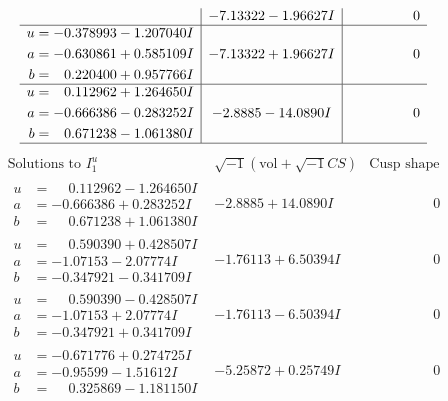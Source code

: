 \documentclass[1p]{elsarticle_modified}
\theoremstyle{definition}
\newcommand{\I}{\sqrt{-1}}
\begin{document}
$$\begin{array}{c|c|c}
 & -7.13322 - 1.96627 I & \phantom{-0.000000 } 0 \\ \hline\begin{aligned}
u &= -0.378993 - 1.207040 I \\
a &= -0.630861 + 0.585109 I \\
b &= \phantom{-}0.220400 + 0.957766 I\end{aligned}
 & -7.13322 + 1.96627 I & \phantom{-0.000000 } 0 \\ \hline\begin{aligned}
u &= \phantom{-}0.112962 + 1.264650 I \\
a &= -0.666386 - 0.283252 I \\
b &= \phantom{-}0.671238 - 1.061380 I\end{aligned}
 & -2.8885 - 14.0890 I & \phantom{-0.000000 } 0\\
 \hline 
 \end{array}$$\newpage$$\begin{array}{c|c|c}  
\text{Solutions to }I^u_{1}& \I (\text{vol} + \sqrt{-1}CS) & \text{Cusp shape}\\
 \hline 
\begin{aligned}
u &= \phantom{-}0.112962 - 1.264650 I \\
a &= -0.666386 + 0.283252 I \\
b &= \phantom{-}0.671238 + 1.061380 I\end{aligned}
 & -2.8885 + 14.0890 I & \phantom{-0.000000 } 0 \\ \hline\begin{aligned}
u &= \phantom{-}0.590390 + 0.428507 I \\
a &= -1.07153 - 2.07774 I \\
b &= -0.347921 - 0.341709 I\end{aligned}
 & -1.76113 + 6.50394 I & \phantom{-0.000000 } 0 \\ \hline\begin{aligned}
u &= \phantom{-}0.590390 - 0.428507 I \\
a &= -1.07153 + 2.07774 I \\
b &= -0.347921 + 0.341709 I\end{aligned}
 & -1.76113 - 6.50394 I & \phantom{-0.000000 } 0 \\ \hline\begin{aligned}
u &= -0.671776 + 0.274725 I \\
a &= -0.95599 - 1.51612 I \\
b &= \phantom{-}0.325869 - 1.181150 I\end{aligned}
 & -5.25872 + 0.25749 I & \phantom{-0.000000 } 0 \\ \hline\begin{aligned}

\end{aligned}
\end{array}$$
\end{document}
